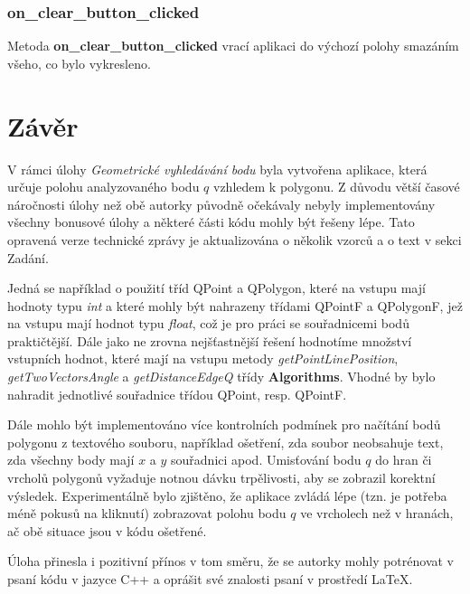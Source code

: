 \documentclass[a4paper, 12pt]{article}
\begin{document}
\subsubsection{on\_clear\_button\_clicked}
Metoda \textbf{on\_clear\_button\_clicked} vrací aplikaci do výchozí polohy smazáním všeho, co bylo vykresleno. 

\clearpage
\section{Závěr}
V rámci úlohy \textit{Geometrické vyhledávání bodu} byla vytvořena aplikace, která určuje polohu analyzovaného bodu $q$ vzhledem k polygonu. Z důvodu větší časové náročnosti úlohy než obě autorky původně očekávaly nebyly implementovány všechny bonusové úlohy a některé části kódu mohly být řešeny lépe. Tato opravená verze technické zprávy je aktualizována o několik vzorců a o text v sekci Zadání. 

Jedná se například o použití tříd QPoint a QPolygon, které na vstupu mají hodnoty typu \textit{int} a které mohly být nahrazeny třídami QPointF a QPolygonF, jež na vstupu mají hodnot typu \textit{float}, což je pro práci se souřadnicemi bodů praktičtější. Dále jako ne zrovna nejšťastnější řešení hodnotíme množství vstupních hodnot, které mají na vstupu metody \textit{getPointLinePosition}, \textit{getTwoVectorsAngle} a \textit{getDistanceEdgeQ} třídy \textbf{Algorithms}. Vhodné by bylo nahradit jednotlivé souřadnice třídou QPoint, resp. QPointF. 

Dále mohlo být implementováno více kontrolních podmínek pro načítání bodů polygonu z textového souboru, například ošetření, zda soubor neobsahuje text, zda všechny body mají $x$ a $y$ souřadnici apod. Umisťování bodu $q$ do hran či vrcholů polygonů vyžaduje notnou dávku trpělivosti, aby se zobrazil korektní výsledek. Experimentálně bylo zjištěno, že aplikace zvládá lépe (tzn. je potřeba méně pokusů na kliknutí) zobrazovat polohu bodu $q$ ve vrcholech než v hranách, ač obě situace jsou v kódu ošetřené. 

Úloha přinesla i pozitivní přínos v tom směru, že se autorky mohly potrénovat v psaní kódu v jazyce C++ a oprášit své znalosti psaní v prostředí LaTeX.

\clearpage
\end{document}
